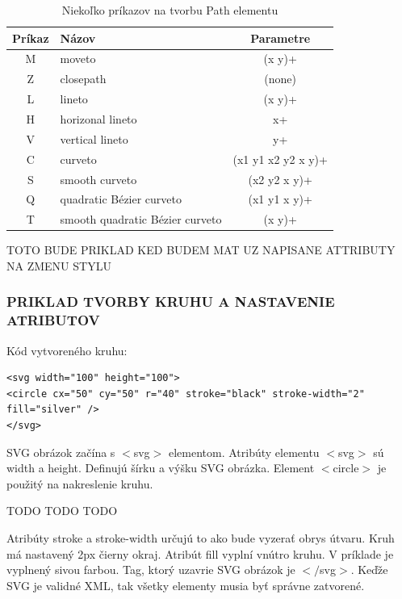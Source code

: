 \begin{center}
	\begin{table}[hp]
		\begin{center}
			\begin{tabular}{|c|l|c|}
				\hline \textbf{Príkaz} & \textbf{Názov} & \textbf{Parametre} \\
				\hline
				\hline M & moveto & (x y)+ \\ 
				\hline Z & closepath & (none) \\ 
				\hline L & lineto & (x y)+ \\ 
				\hline H & horizonal lineto & x+ \\ 
				\hline V & vertical lineto & y+ \\ 
				\hline C & curveto & (x1 y1 x2 y2 x y)+ \\ 
				\hline S & smooth curveto & (x2 y2 x y)+ \\ 
				\hline Q & quadratic Bézier curveto & (x1 y1 x y)+ \\ 
				\hline T & smooth quadratic Bézier curveto & (x y)+ \\ 
				\hline 
			\end{tabular} 
		\end{center}
		\caption{Niekoľko príkazov na tvorbu Path elementu}
		\label{prikazy:Path}
	\end{table}
\end{center}






\newpage
\clearpage
TOTO BUDE PRIKLAD KED BUDEM MAT UZ NAPISANE ATTRIBUTY NA ZMENU STYLU

\subsubsection{PRIKLAD TVORBY KRUHU A NASTAVENIE ATRIBUTOV }

Kód vytvoreného kruhu: 

\begin{lstlisting}
<svg width="100" height="100">
<circle cx="50" cy="50" r="40" stroke="black" stroke-width="2" fill="silver" />
</svg>	
\end{lstlisting}

SVG obrázok začína s $<$svg$>$ elementom. Atribúty elementu $<$svg$>$ sú width a height. Definujú šírku a výšku SVG obrázka. Element $<$circle$>$ je použitý na nakreslenie kruhu.


TODO TODO TODO

 Atribúty stroke a stroke-width určujú to ako bude vyzerať obrys útvaru. Kruh má nastavený 2px čierny okraj. 
Atribút fill vyplní vnútro kruhu. V príklade je vyplnený sivou farbou. Tag, ktorý uzavrie SVG obrázok je $<$$/$svg$>$. Keďže SVG je validné XML, tak všetky elementy musia byť správne zatvorené. \cite{inline}

